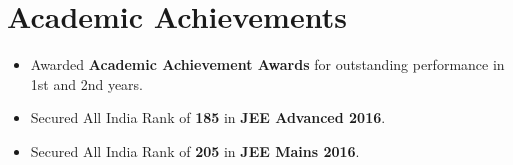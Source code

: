 \section*{Academic Achievements}
\begin{itemize}[itemsep=0mm]

\item Awarded \textbf{Academic Achievement Awards} for outstanding performance in 1st and 2nd years.
\item Secured All India Rank of {\bf 185} in {\bf JEE Advanced 2016}.
\item Secured All India Rank of {\bf 205} in {\bf JEE Mains 2016}.

\end{itemize}
